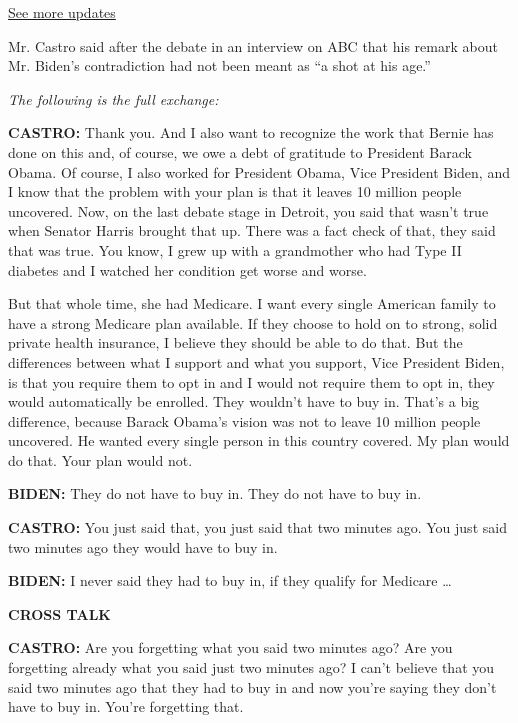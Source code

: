 \href{https://www.nytimes.com/2020/07/31/us/elections/biden-vs-trump.html?action=click\&pgtype=Article\&state=default\&region=MAIN_CONTENT_1\&context=storylines_live_updates}{See
more updates}

Mr. Castro said after the debate in an interview on ABC that his remark
about Mr. Biden's contradiction had not been meant as ``a shot at his
age.''

\emph{The following is the full exchange:}

\textbf{CASTRO:} Thank you. And I also want to recognize the work that
Bernie has done on this and, of course, we owe a debt of gratitude to
President Barack Obama. Of course, I also worked for President Obama,
Vice President Biden, and I know that the problem with your plan is that
it leaves 10 million people uncovered. Now, on the last debate stage in
Detroit, you said that wasn't true when Senator Harris brought that up.
There was a fact check of that, they said that was true. You know, I
grew up with a grandmother who had Type II diabetes and I watched her
condition get worse and worse.

But that whole time, she had Medicare. I want every single American
family to have a strong Medicare plan available. If they choose to hold
on to strong, solid private health insurance, I believe they should be
able to do that. But the differences between what I support and what you
support, Vice President Biden, is that you require them to opt in and I
would not require them to opt in, they would automatically be enrolled.
They wouldn't have to buy in. That's a big difference, because Barack
Obama's vision was not to leave 10 million people uncovered. He wanted
every single person in this country covered. My plan would do that. Your
plan would not.

\textbf{BIDEN:} They do not have to buy in. They do not have to buy in.

\textbf{CASTRO:} You just said that, you just said that two minutes ago.
You just said two minutes ago they would have to buy in.

\textbf{BIDEN:} I never said they had to buy in, if they qualify for
Medicare \ldots{}

\textbf{CROSS TALK}

\textbf{CASTRO:} Are you forgetting what you said two minutes ago? Are
you forgetting already what you said just two minutes ago? I can't
believe that you said two minutes ago that they had to buy in and now
you're saying they don't have to buy in. You're forgetting that.

